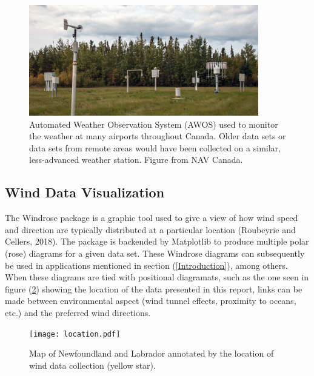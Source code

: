 \documentclass{article}
\begin{document}
\begin{figure}[h!]
\centering
\includegraphics[width=10cm]{Images/AWOS.jpg}
\caption{Automated Weather Observation System (AWOS) used to monitor the weather at many airports throughout Canada. Older data sets or data sets from remote areas would have been collected on a 
similar, less-advanced weather station. Figure from NAV Canada.}
\label{AWOS}
\end{figure}

\subsection{Wind Data Visualization}\label{Wind_data_visualization}

The Windrose package is a graphic tool used to give a view of how wind speed and direction are typically distributed at a particular location (Roubeyrie and Cellers, 2018). The package is backended by 
Matplotlib to produce multiple polar (rose) diagrams for a given data set. These Windrose diagrams can subsequently be used in applications mentioned in section (\ref{Introduction}), among others. When 
these diagrams are tied with positional diagramats, such as the one seen in figure (\ref{location}) showing the location of the data presented in this report, links can be made between environmental 
aspect 
(wind tunnel effects, proximity to oceans, etc.) and the preferred wind directions.

\begin{figure}[h!]                                                                                                                                                                                                 
\centering                                                                                                                                                                                                         
\texttt{[image: location.pdf]}                                                                                                                                                                       
\caption{Map of Newfoundland and Labrador annotated by the location of wind data collection (yellow star).}                                                                                                              
\label{location}                                                                                                                                                                                                   
\end{figure}
\end{document}
